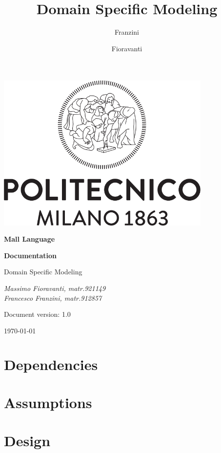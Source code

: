 \documentclass[a4paper]{article}
\author{Franzini \and Fioravanti}
\title{Domain Specific Modeling}
\begin{document}
	
\begin{titlepage}
	\centering
	\includegraphics[width=0.80\textwidth]{pictures/Logo_Politecnico_Milano}\par
	\vspace{1.5cm}
	{\LARGE \textbf {Mall Language} \par}
	\vspace{0.3cm}
	{\large \textbf{Documentation} \par}
	\vspace{1.5cm}
	{\Large{Domain Specific Modeling} \par}
	\vspace{1.5cm}
	{\Large\itshape Massimo Fioravanti, matr.921149 \\
				    Francesco Franzini, matr.912857 \\ }
	\vspace{2cm}
	\vfill
	{\large Document version: 1.0\par}
	{\large \today \par}
\end{titlepage}	
	
\maketitle
\tableofcontents
\clearpage

\section{Dependencies}
\section{Assumptions}
\section{Design}
\end{document}
